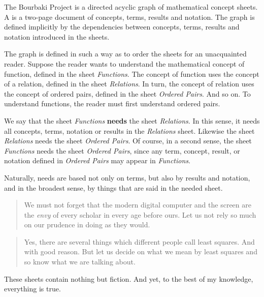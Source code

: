 
The Bourbaki Project is a directed acyclic graph of
mathematical concept sheets.
A  is a two-page document of
concepts, terms, results and notation.
The graph is defined implicitly by
the dependencies between concepts, terms,
results and notation introduced in the sheets.

The graph is defined in such a way as to
order the sheets for an unacquainted reader.
Suppose the reader wants to understand the
mathematical concept of function, defined
in the sheet \textit{Functions}.
The concept of function uses the concept of a
relation,
defined in the sheet \textit{Relations}.
In turn, the concept of relation uses the
concept of ordered pairs, defined in
the sheet \textit{Ordered Pairs}.
And so on.
To understand functions, the reader must
first understand ordered pairs.

We say that the sheet \textit{Functions}
\textbf{needs} the sheet \textit{Relations}.
In this sense, it needs all concepts,
terms, notation or results in the
\textit{Relations} sheet.
Likewise the sheet \textit{Relations}
needs the sheet \textit{Ordered Pairs}.
Of course, in a second sense, the sheet
\textit{Functions} needs the sheet
\textit{Ordered Pairs},
since any term, concept,
result, or notation defined in
\textit{Ordered Pairs} may appear in
\textit{Functions}.

Naturally, needs are based not only
on terms, but also by results and notation,
and in the broadest sense, by things that are said in the
needed sheet.

\clearpage


\begin{quote}
We must not forget that the
modern digital computer and
the screen are the \textit{envy} of
every scholar in every age
before ours. Let us not rely
so much
on our prudence in doing
as they would.
\end{quote}

\begin{quote}
Yes, there are several things
which different people call
least squares. And with good
reason. But let us decide on
what we mean by least squares
and so know what we are talking
about.
\end{quote}

These sheets contain nothing
but fiction. And yet, to the best
of my knowledge, everything
is true.
